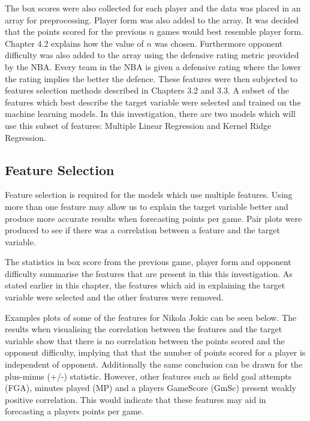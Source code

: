 \documentclass[a4paper,11pt,twoside]{article}
\begin{document}
The box scores were also collected for each player and the data was placed in an array for preprocessing.  Player form was also added to the array. It was decided that the points scored for the previous $n$ games would best resemble player form. Chapter 4.2 explains how the value of $n$ was chosen. Furthermore opponent difficulty was also added to the array using the defensive rating metric provided by the NBA. Every team in the NBA is given a defensive rating where the lower the rating implies the better the defence. These features were then subjected to features selection methods described in Chapters 3.2 and 3.3. A subset of the features which best describe the target variable were selected and trained on the machine learning models. In this investigation, there are two models which will use this subset of features: Multiple Linear Regression and Kernel Ridge Regression.


\subsection{Feature Selection}

Feature selection is required for the models which use multiple features. Using more than one feature may allow us to explain the target variable better and produce more accurate results when forecasting points per game.  Pair plots were produced to see if there was a correlation between a feature and the target variable. 

The statistics in box score from the previous game, player form and opponent difficulty summarise the features that are present in this this investigation. As stated earlier in this chapter,  the features which aid in explaining the target variable were selected and the other features were removed.

Examples plots of some of the features for Nikola Jokic can be seen below. The results when visualising the correlation between the features and the target variable show that there is no correlation between the points scored and the opponent difficulty, implying that that the number of points scored for a player is independent of opponent. Additionally the same conclusion can be drawn for the plus-minus (+/-) statistic. However, other features such as field goal attempts (FGA), minutes played (MP) and a players GameScore (GmSc) present weakly positive correlation. This would indicate that these features may aid in forecasting a players points per game. 
\end{document}
